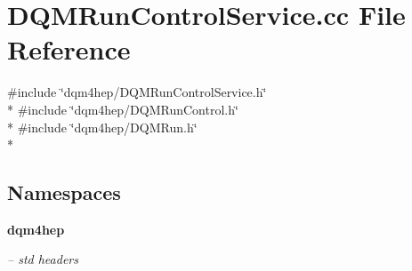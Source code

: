 \section{D\+Q\+M\+Run\+Control\+Service.\+cc File Reference}
\label{DQMRunControlService_8cc}
{\ttfamily \#include \char`\"{}dqm4hep/\+D\+Q\+M\+Run\+Control\+Service.\+h\char`\"{}}\\*
{\ttfamily \#include \char`\"{}dqm4hep/\+D\+Q\+M\+Run\+Control.\+h\char`\"{}}\\*
{\ttfamily \#include \char`\"{}dqm4hep/\+D\+Q\+M\+Run.\+h\char`\"{}}\\*
\subsection*{Namespaces}
\begin{DoxyCompactItemize}
\item 
 {\bf dqm4hep}
\begin{DoxyCompactList}\small\item\em -- std headers \end{DoxyCompactList}\end{DoxyCompactItemize}
